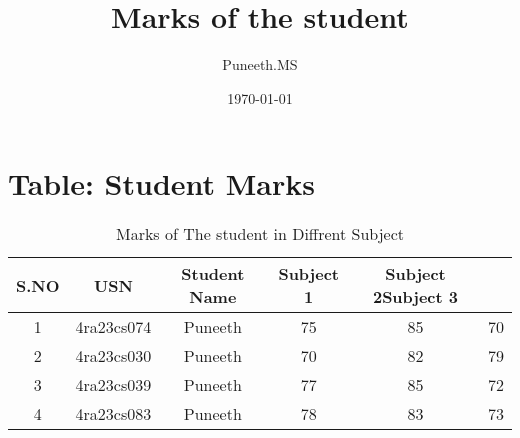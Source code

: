 \documentclass[a4paper,12pt]{article}
\begin{document}
\title{Marks of the student}
\author{Puneeth.MS}
\date{\today}
\maketitle
\section{Table: Student Marks}
\begin{table}[h!]
    \centering
    \begin{tabular}{|c|c|c|c|c|c|}
        \hline
        \textbf{S.NO}&\textbf{USN}&\textbf{Student Name}&\textbf{Subject 1}&\textbf{Subject 2}\textbf{Subject 3}\\ \hline
        1 & 4ra23cs074 & Puneeth & 75 & 85 & 70 \\ \hline
        2 & 4ra23cs030 & Puneeth & 70 & 82 & 79 \\ \hline
        3 & 4ra23cs039 & Puneeth & 77 & 85 & 72 \\ \hline
        4 & 4ra23cs083 & Puneeth & 78 & 83 & 73 \\ \hline        
    \end{tabular}
    \caption{ Marks of The student in Diffrent Subject}
\end{table}
\end{document}
